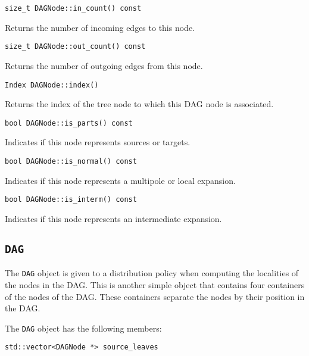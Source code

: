 \begin{lstlisting}
size_t DAGNode::in_count() const
\end{lstlisting}

\noindent Returns the number of incoming edges to this node.

\begin{lstlisting}
size_t DAGNode::out_count() const
\end{lstlisting}

\noindent Returns the number of outgoing edges from this node.

\begin{lstlisting}
Index DAGNode::index()
\end{lstlisting}

\noindent Returns the index of the tree node to which this DAG node is
associated.

\begin{lstlisting}
bool DAGNode::is_parts() const
\end{lstlisting}

\noindent Indicates if this node represents sources or targets.

\begin{lstlisting}
bool DAGNode::is_normal() const
\end{lstlisting}

\noindent Indicates if this node represents a multipole or local expansion.

\begin{lstlisting}
bool DAGNode::is_interm() const
\end{lstlisting}

\noindent Indicates if this node represents an intermediate expansion.


\subsection{\texttt{DAG}}

The \texttt{DAG} object is given to a distribution policy when computing the
localities of the nodes in the DAG. This is another simple object that contains
four containers of the nodes of the DAG. These containers separate the nodes
by their position in the DAG.

The \texttt{DAG} object has the following members:

\begin{lstlisting}
std::vector<DAGNode *> source_leaves
\end{lstlisting}

